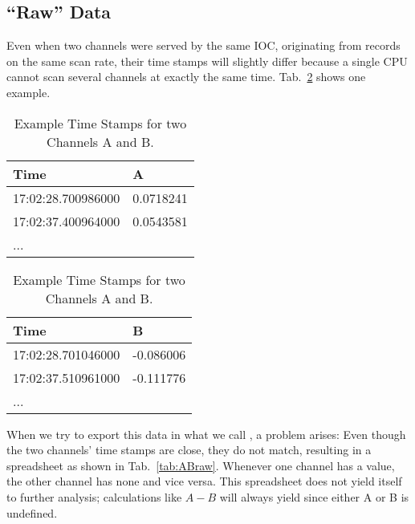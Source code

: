 \subsection{``Raw'' Data}
Even when two channels were served by the same IOC, originating from
records on the same scan rate, their time stamps will slightly differ
because a single CPU cannot scan several channels at exactly the same
time.  Tab.~\ref{tab:ABtimes} shows one example.

\begin{table}[htbp]
  \begin{center}
    \begin{minipage}[t]{0.49\textwidth}
      \begin{tabular}[t]{l|l}
        Time               & A         \\
        \hline
        17:02:28.700986000 & 0.0718241 \\
        17:02:37.400964000 & 0.0543581 \\
        ...
      \end{tabular}
    \end{minipage}%
    \begin{minipage}[t]{0.49\textwidth}
      \begin{tabular}[t]{l|l}
        Time               & B         \\
        \hline
        17:02:28.701046000 & -0.086006 \\
        17:02:37.510961000 & -0.111776 \\
        ...
      \end{tabular}
    \end{minipage}%
    \caption{Example Time Stamps for two Channels A and B.}
    \label{tab:ABtimes}
  \end{center}
\end{table}

\noindent When we try to export this data in what we call , a problem arises: Even though the two channels'
time stamps are close, they do not match, resulting in a spreadsheet
as shown in Tab.~\ref{tab:ABraw}. Whenever one channel has a value,
the other channel has none and vice versa.  This spreadsheet does
not yield itself to further analysis; calculations like $A-B$ will
always yield  since either A or B is undefined.

